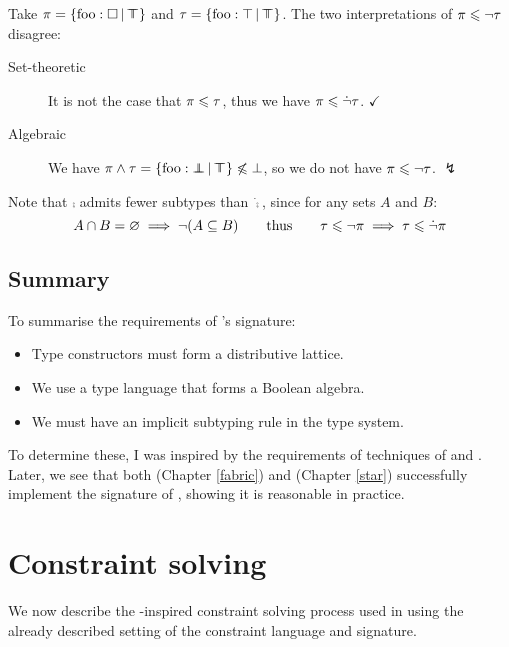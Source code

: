 \begin{example}
    Take $\pi = \flext{\mathrm{foo}: \flabsent }{\flftop}$ and $\tau = \flext{\mathrm{foo}: \top}{\flftop}$. The two interpretations of $\pi \leqslant \lnot \tau$ disagree: \begin{description}
        \item[Set-theoretic] It is not the case that $\pi \leqslant \tau$, thus we have $\pi \leqslant \dot {\lnot} \tau$. $\checkmark$
        \item[Algebraic] We have $\pi \meet \tau = \flext{\mathrm{foo} : \flfbot }{\flftop} \not\sub \bot$, so we do not have $\pi \leqslant \lnot \tau$. $\lightning$
    \end{description}
    Note that $\comp$ admits fewer subtypes than $\dot \comp$, since for any sets $A$ and $B$: 
    $$A \cap B = \varnothing \implies \lnot(A \subseteq B) \qquad\text{thus}\qquad \tau \leqslant \lnot \pi \implies \tau \leqslant \dot{\lnot} \pi $$ 
\end{example}

\subsection{Summary} To summarise the requirements of \inference{}'s signature: \begin{itemize}
    \item Type constructors must form a distributive lattice.
    \item We use a type language that forms a Boolean algebra.
    \item We must have an implicit subtyping rule in the type system.
\end{itemize} 
To determine these, I was inspired by the requirements of techniques of \textcite{mlsub} and \textcite{mlstruct}.
Later, we see that both \fabric{} (Chapter \ref{fabric}) and \starr{} (Chapter \ref{star}) successfully implement the signature of \inference{}, showing it is reasonable in practice.

\section{Constraint solving}
\label{sec:constraints}

We now describe the \mlstruct{}-inspired constraint solving process used in \inference{} using the already described setting of the constraint language and signature. 


